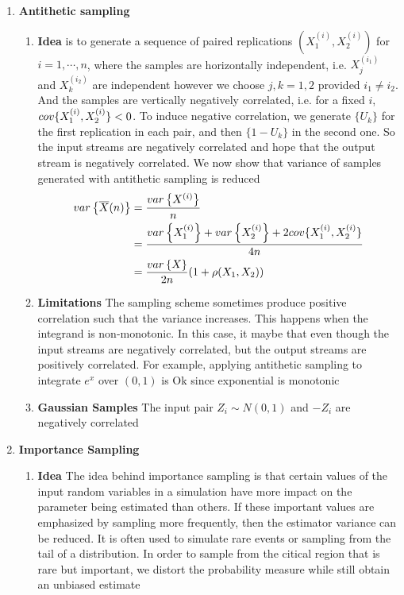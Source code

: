 \documentclass[11pt]{article}
\begin{document}
\begin{enumerate}
    \item \textbf{Antithetic sampling} 
    \begin{enumerate}
        \item \textbf{Idea} is to generate a sequence of paired replications $(X_1^{(i)}, X_2^{(i)})$ for $i=1,\cdots, n$, where the samples are horizontally independent, i.e. $X_j^{(i_1)}$ and $X_k^{(i_2)}$ are independent however we choose $j,k=  1,2$ provided $i_1 \neq i_2$. And the samples are vertically negatively correlated, i.e. for a fixed $i$, $cov\{X_1^{(i)}, X_2^{(i)}\} < 0$. To induce negative correlation, we generate $\{U_k\}$ for the first replication in each pair, and then $\{1-U_k\}$ in the second one. So the input streams are negatively correlated and hope that the output stream is negatively correlated. We now show that variance of samples generated with antithetic sampling is reduced 
        \begin{align*}
            var_{}\left\{\overline{X}(n)\right\} 
            &= \frac{var_{}\left\{X^{(i)}\right\}}{n}  \\ 
            &= \frac{var_{}\left\{X_1^{(i)}\right\} + var_{}\left\{X_2^{(i)}\right\} + 2cov\{X_1^{(i)}, X_2^{(i)}\}}{4n} \\ 
            &= \frac{var_{}\left\{X\right\}}{2n} (1 + \rho (X_1, X_2)) \\ 
        \end{align*}
        \item \textbf{Limitations} The sampling scheme sometimes produce positive correlation such that the variance increases. This happens when the integrand is non-monotonic. In this case, it maybe that even though the input streams are negatively correlated, but the output streams are positively correlated. For example, applying antithetic sampling to integrate $e^x$ over $(0,1)$ is Ok since exponential is monotonic
        \item \textbf{Gaussian Samples} The input pair $Z_i \sim N(0,1)$ and $-Z_i$ are negatively correlated
    \end{enumerate}
    \item \textbf{Importance Sampling} 
    \begin{enumerate}
        \item \textbf{Idea} The idea behind importance sampling is that certain values of the input random variables in a simulation have more impact on the parameter being estimated than others. If these important values are emphasized by sampling more frequently, then the estimator variance can be reduced. It is often used to simulate rare events or sampling from the tail of a distribution. In order to sample from the citical region that is rare but important, we distort the probability measure while still obtain an unbiased estimate

\end{enumerate}
\end{enumerate}
\end{document}
